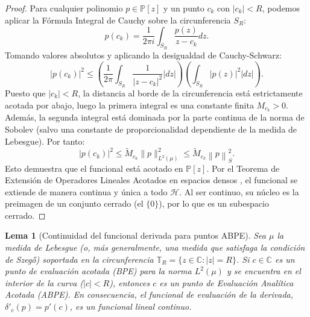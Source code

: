 \documentclass[12pt,a4paper]{article}
\newtheorem{lemma}{Lema}
\theoremstyle{definition}
\theoremstyle{remark}
\newcommand{\Poly}{\mathbb{P}[z]}
\newcommand{\norm}[1]{\left\| #1 \right\|_S}
\newcommand{\abs}[1]{\left| #1 \right|}
\begin{document}
\begin{proof}
	Para cualquier polinomio $p \in \Poly$ y un punto $c_k$ con $\abs{c_k} < R$, podemos aplicar la Fórmula Integral de Cauchy sobre la circunferencia $S_R$:
	$$ p(c_k) = \frac{1}{2\pi i} \int_{S_R} \frac{p(z)}{z - c_k} dz. $$
	Tomando valores absolutos y aplicando la desigualdad de Cauchy-Schwarz:
	$$ \abs{p(c_k)}^2 \leq \left( \frac{1}{2\pi} \int_{S_R} \frac{1}{\abs{z - c_k}^2} \abs{dz} \right) \left( \int_{S_R} \abs{p(z)}^2 \abs{dz} \right). $$
	Puesto que $\abs{c_k} < R$, la distancia al borde de la circunferencia está estrictamente acotada por abajo, luego la primera integral es una constante finita $M_{c_k} > 0$. Además, la segunda integral está dominada por la parte continua de la norma de Sobolev (salvo una constante de proporcionalidad dependiente de la medida de Lebesgue). Por tanto:
	$$ \abs{p(c_k)}^2 \leq \tilde{M}_{c_k} \|p\|_{L^2(\mu)}^2 \leq \tilde{M}_{c_k} \norm{p}^2. $$
	Esto demuestra que el funcional está acotado en $\Poly$. Por el Teorema de Extensión de Operadores Lineales Acotados en espacios densos \cite{kreyszig1989introductory}, el funcional se extiende de manera continua y única a todo $\mathcal{H}$. Al ser continuo, su núcleo es la preimagen de un conjunto cerrado (el $\{0\}$), por lo que es un subespacio cerrado.
\end{proof}

\begin{lemma}[Continuidad del funcional derivada para puntos ABPE]
	\label{lema:ABPE_derivada}
	Sea $\mu$ la medida de Lebesgue (o, más generalmente, una medida que satisfaga la condición de Szegő) soportada en la circunferencia $\mathbb{T}_R = \{z \in \mathbb{C} : |z| = R\}$. Si $c \in \mathbb{C}$ es un punto de evaluación acotada (BPE) para la norma $L^2(\mu)$ y se encuentra en el interior de la curva ($|c| < R$), entonces $c$ es un punto de Evaluación Analítica Acotada (ABPE). En consecuencia, el funcional de evaluación de la derivada, $\delta'_c(p) = p'(c)$, es un funcional lineal continuo.
\end{lemma}
\end{document}
